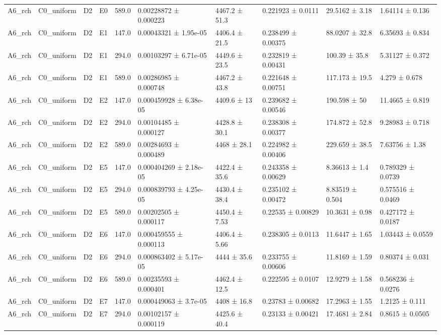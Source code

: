 \begin{table}
\begin{tabular}{llllllllll}
A6\_rch & C0\_uniform & D2 & E0 & 589.0 & 0.00228872 ± 0.000223 & 4467.2 ± 51.3 & 0.221923 ± 0.0111 & 29.5162 ± 3.18 & 1.64114 ± 0.136 \\
A6\_rch & C0\_uniform & D2 & E1 & 147.0 & 0.00043321 ± 1.95e-05 & 4406.4 ± 21.5 & 0.238499 ± 0.00375 & 88.0207 ± 32.8 & 6.35693 ± 0.834 \\
A6\_rch & C0\_uniform & D2 & E1 & 294.0 & 0.00103297 ± 6.71e-05 & 4449.6 ± 23.5 & 0.232819 ± 0.00431 & 100.39 ± 35.8 & 5.31127 ± 0.372 \\
A6\_rch & C0\_uniform & D2 & E1 & 589.0 & 0.00286985 ± 0.000748 & 4467.2 ± 43.8 & 0.221648 ± 0.00751 & 117.173 ± 19.5 & 4.279 ± 0.678 \\
A6\_rch & C0\_uniform & D2 & E2 & 147.0 & 0.000459928 ± 6.38e-05 & 4409.6 ± 13 & 0.239682 ± 0.00546 & 190.598 ± 50 & 11.4665 ± 0.819 \\
A6\_rch & C0\_uniform & D2 & E2 & 294.0 & 0.00104485 ± 0.000127 & 4428.8 ± 30.1 & 0.238308 ± 0.00377 & 174.872 ± 52.8 & 9.28983 ± 0.718 \\
A6\_rch & C0\_uniform & D2 & E2 & 589.0 & 0.00284693 ± 0.000489 & 4468 ± 28.1 & 0.224982 ± 0.00406 & 229.659 ± 38.5 & 7.63756 ± 1.38 \\
A6\_rch & C0\_uniform & D2 & E5 & 147.0 & 0.000404269 ± 2.18e-05 & 4422.4 ± 35.6 & 0.243358 ± 0.00629 & 8.36613 ± 1.4 & 0.789329 ± 0.0739 \\
A6\_rch & C0\_uniform & D2 & E5 & 294.0 & 0.000839793 ± 4.25e-05 & 4430.4 ± 38.4 & 0.235102 ± 0.00472 & 8.83519 ± 0.504 & 0.575516 ± 0.0469 \\
A6\_rch & C0\_uniform & D2 & E5 & 589.0 & 0.00202505 ± 0.000117 & 4450.4 ± 7.53 & 0.22535 ± 0.00829 & 10.3631 ± 0.98 & 0.427172 ± 0.0187 \\
A6\_rch & C0\_uniform & D2 & E6 & 147.0 & 0.000459555 ± 0.000113 & 4406.4 ± 5.66 & 0.238305 ± 0.0113 & 11.6447 ± 1.65 & 1.03443 ± 0.0559 \\
A6\_rch & C0\_uniform & D2 & E6 & 294.0 & 0.000863402 ± 5.17e-05 & 4444 ± 35.6 & 0.233755 ± 0.00606 & 11.8169 ± 1.59 & 0.80374 ± 0.031 \\
A6\_rch & C0\_uniform & D2 & E6 & 589.0 & 0.00235593 ± 0.000401 & 4462.4 ± 12.5 & 0.222595 ± 0.0107 & 12.9279 ± 1.58 & 0.568236 ± 0.0276 \\
A6\_rch & C0\_uniform & D2 & E7 & 147.0 & 0.000449063 ± 3.7e-05 & 4408 ± 16.8 & 0.23783 ± 0.00682 & 17.2963 ± 1.55 & 1.2125 ± 0.111 \\
A6\_rch & C0\_uniform & D2 & E7 & 294.0 & 0.00102157 ± 0.000119 & 4425.6 ± 40.4 & 0.23133 ± 0.00421 & 17.4681 ± 2.84 & 0.8615 ± 0.0505 \\

\end{tabular}
\end{table}
